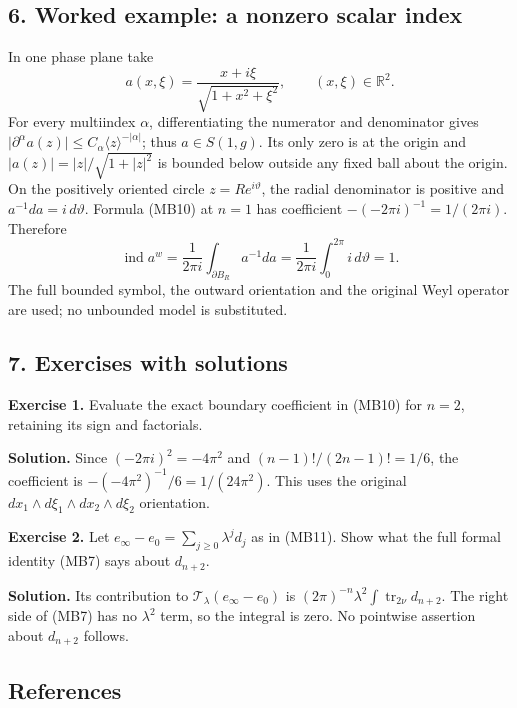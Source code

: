 \documentclass[
  11pt,
]{article}
\begin{document}
\subsection{6. Worked example: a nonzero scalar
index}\label{worked-example-a-nonzero-scalar-index}

In one phase plane take \[
 a(x,\xi)=\frac{x+i\xi}{\sqrt{1+x^2+\xi^2}},
 \qquad (x,\xi)\in\mathbb R^2 .
 \tag{MI1}
\] For every multiindex \(\alpha\), differentiating the numerator and
denominator gives \(\lvert\partial^\alpha a(z)\rvert
\le C_\alpha\langle z\rangle^{-|\alpha|}\); thus \(a\in S(1,g)\). Its
only zero is at the origin and \(\lvert a(z)\rvert=|z|/\sqrt{1+|z|^2}\)
is bounded below outside any fixed ball about the origin. On the
positively oriented circle \(z=Re^{i\vartheta}\), the radial denominator
is positive and \(a^{-1}da=i\,d\vartheta\). Formula (MB10) at \(n=1\)
has coefficient \(-(-2\pi i)^{-1}=1/(2\pi i)\). Therefore \[
 \operatorname{ind}a^w
 =\frac{1}{2\pi i}\int_{\partial B_R}a^{-1}da
 =\frac{1}{2\pi i}\int_0^{2\pi}i\,d\vartheta
 =1 .
 \tag{MI2}
\] The full bounded symbol, the outward orientation and the original
Weyl operator are used; no unbounded model is substituted.

\subsection{7. Exercises with solutions}\label{exercises-with-solutions}

\textbf{Exercise 1.} Evaluate the exact boundary coefficient in (MB10)
for \(n=2\), retaining its sign and factorials.

\textbf{Solution.} Since \((-2\pi i)^2=-4\pi^2\) and
\((n-1)!/(2n-1)!=1/6\), the coefficient is
\(-(-4\pi^2)^{-1}/6=1/(24\pi^2)\). This uses the original
\(dx_1\wedge d\xi_1\wedge dx_2\wedge d\xi_2\) orientation.

\textbf{Exercise 2.} Let \(e_\infty-e_0=\sum_{j\ge0}\lambda^j d_j\) as
in (MB11). Show what the full formal identity (MB7) says about
\(d_{n+2}\).

\textbf{Solution.} Its contribution to
\(\mathcal T_\lambda(e_\infty-e_0)\) is
\((2\pi)^{-n}\lambda^2\int\operatorname{tr}_{2\nu}d_{n+2}\). The right
side of (MB7) has no \(\lambda^2\) term, so the integral is zero. No
pointwise assertion about \(d_{n+2}\) follows.

\subsection{References}\label{references}
\end{document}

